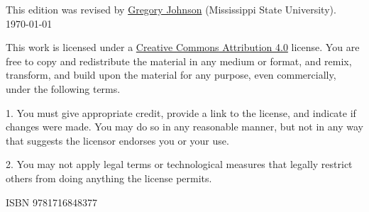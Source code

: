\noindent This edition was revised by \href{http://loighic.net/}{Gregory Johnson} (Mississippi State University).\\[1ex]
\indent \today

\bigskip
\bigskip

\noindent \footnotesize This work is licensed under a \href{https://creativecommons.org/licenses/by/4.0/}{Creative Commons Attribution 4.0} license. 
You are free to copy and redistribute the material in any medium or format, and  remix, transform, and build upon the material for any purpose, even commercially, under the following terms.
\begin{earg}
\item[1.] You must give appropriate credit, provide a link to the license, and indicate if changes were made. You may do so in any reasonable manner, but not in any way that suggests the licensor endorses you or your use.
\item[2.] You may not apply legal terms or technological measures that legally restrict others from doing anything the license permits.
\end{earg}
\medskip

\noindent ISBN 9781716848377


\normalsize 
